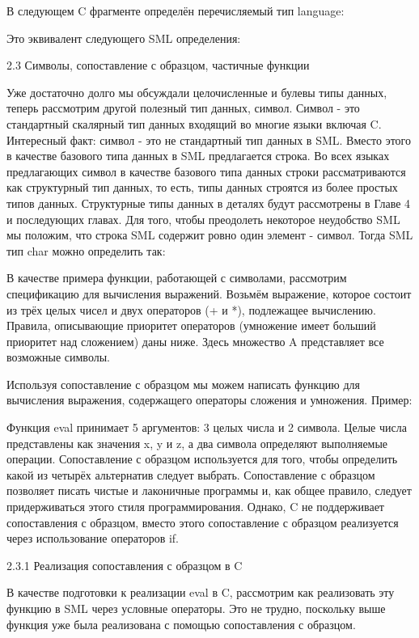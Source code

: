 В следующем C фрагменте определён перечисляемый тип language:

Это эквивалент следующего SML определения:

2.3 Символы, сопоставление с образцом, частичные функции

Уже достаточно долго мы обсуждали целочисленные и булевы типы данных, теперь рассмотрим другой полезный тип данных, символ. Символ - это стандартный скалярный тип данных входящий во многие языки включая C. Интересный факт: символ - это не стандартный тип данных в SML. Вместо этого в качестве базового типа данных в SML предлагается строка. Во всех языках предлагающих символ в качестве базового типа данных строки рассматриваются как структурный тип данных, то есть, типы данных строятся из более простых типов данных. Структурные типы данных в деталях будут рассмотрены в Главе 4 и последующих главах. Для того, чтобы преодолеть некоторое неудобство SML мы положим, что строка SML содержит ровно один элемент - символ. Тогда SML тип char можно определить так:

В качестве примера функции, работающей с символами, рассмотрим спецификацию для вычисления выражений. Возьмём выражение, которое состоит из трёх целых чисел и двух операторов (+ и *), подлежащее вычислению. Правила, описывающие приоритет операторов (умножение имеет больший приоритет над сложением) даны ниже. Здесь множество A представляет все возможные символы.

Используя сопоставление с образцом мы можем написать функцию для вычисления выражения, содержащего операторы сложения и умножения. Пример:

Функция eval принимает 5 аргументов: 3 целых числа и 2 символа. Целые числа представлены как значения x, y и z, а два символа определяют выполняемые операции. Сопоставление с образцом используется для того, чтобы определить какой из четырёх альтернатив следует выбрать. Сопоставление с образцом позволяет писать чистые и лаконичные программы и, как общее правило, следует придерживаться этого стиля программирования. Однако, C не поддерживает сопоставления с образцом, вместо этого сопоставление с образцом реализуется через использование операторов if.

2.3.1 Реализация сопоставления с образцом в C

В качестве подготовки к реализации eval в C, рассмотрим как реализовать эту функцию в SML через условные операторы. Это не трудно, поскольку выше функция уже была реализована с помощью сопоставления с образцом.

